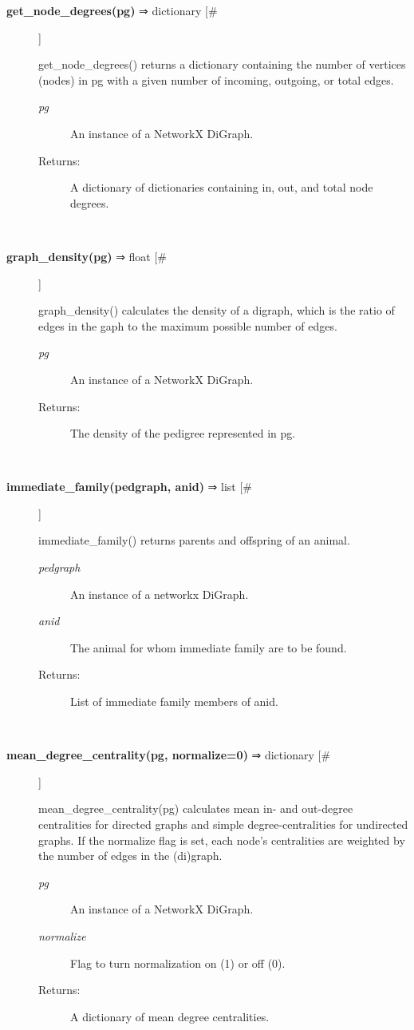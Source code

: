 \begin{description}
\item[\textbf{get\_node\_degrees(pg)} ⇒ dictionary [\#]
]
\par get\_node\_degrees() returns a dictionary containing the number of
vertices (nodes) in pg with a given number of incoming, outgoing,
or total edges.
\begin{description}
\item[\textit{pg}
]
An instance of a NetworkX DiGraph.
\item[Returns:
]
A dictionary of dictionaries containing in, out, and total node degrees.
\end{description}\\

\item[\textbf{graph\_density(pg)} ⇒ float [\#]
]
\par graph\_density() calculates the density of a digraph, which is the
ratio of edges in the gaph to the maximum possible number of edges.
\begin{description}
\item[\textit{pg}
]
An instance of a NetworkX DiGraph.
\item[Returns:
]
The density of the pedigree represented in pg.
\end{description}\\

\item[\textbf{immediate\_family(pedgraph, anid)} ⇒ list [\#]
]
\par immediate\_family() returns parents and offspring of an animal.
\begin{description}
\item[\textit{pedgraph}
]
An instance of a networkx DiGraph.
\item[\textit{anid}
]
The animal for whom immediate family are to be found.
\item[Returns:
]
List of immediate family members of anid.
\end{description}\\

\item[\textbf{mean\_degree\_centrality(pg, normalize=0)} ⇒ dictionary [\#]
]
\par mean\_degree\_centrality(pg) calculates mean in- and out-degree
centralities for directed graphs and simple degree-centralities
for undirected graphs. If the normalize flag is set, each node's
centralities are weighted by the number of edges in the (di)graph.
\begin{description}
\item[\textit{pg}
]
An instance of a NetworkX DiGraph.
\item[\textit{normalize}
]
Flag to turn normalization on (1) or off (0).
\item[Returns:
]
A dictionary of mean degree centralities.
\end{description}\\


\end{description}
